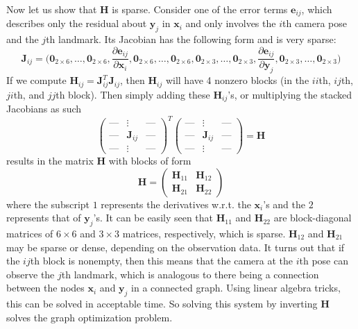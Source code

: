 \documentclass{article}
\theoremstyle{definition}
\theoremstyle{remark}
\theoremstyle{definition}
\begin{document}
Now let us show that $\mathbf{H}$ is sparse. Consider one of the error terms $\mathbf{e}_{ij}$, which describes only the residual about $\mathbf{y}_j$ in $\mathbf{x}_i$ and only involves the $i$th camera pose and the $j$th landmark. Its Jacobian has the following form and is very sparse: 
\[\mathbf{J}_{ij} = \bigg( \mathbf{0}_{2 \times 6}, \ldots, \mathbf{0}_{2 \times 6}, \frac{\partial \mathbf{e}_{ij}}{\partial \mathbf{x}_i}, \mathbf{0}_{2 \times 6}, \ldots, \mathbf{0}_{2 \times 6}, \mathbf{0}_{2 \times 3}, \ldots, \mathbf{0}_{2 \times 3}, \frac{\partial \mathbf{e}_{ij}}{\partial \mathbf{y}_j}, \mathbf{0}_{2 \times 3}, \ldots, \mathbf{0}_{2 \times 3} \bigg)\]
If we compute $\mathbf{H}_{ij} = \mathbf{J}_{ij}^T \mathbf{J}_{ij}$, then $\mathbf{H}_{ij}$ will have 4 nonzero blocks (in the $ii$th, $ij$th, $ji$th, and $jj$th block). Then simply adding these $\mathbf{H}_{ij}$'s, or multiplying the stacked Jacobians as such 
\[\begin{pmatrix} \text{---} & \vdots & \text{---} \\ \text{---} & \mathbf{J}_{ij} & \text{---} \\ \text{---} & \vdots & \text{---} \end{pmatrix}^T \begin{pmatrix} \text{---} & \vdots & \text{---} \\ \text{---} & \mathbf{J}_{ij} & \text{---} \\ \text{---} & \vdots & \text{---} \end{pmatrix} = \mathbf{H}\]
results in the matrix $\mathbf{H}$ with blocks of form 
\[\mathbf{H} = \begin{pmatrix} \mathbf{H}_{11} & \mathbf{H}_{12} \\ \mathbf{H}_{21}  & \mathbf{H}_{22} \end{pmatrix}\]
where the subscript $1$ represents the derivatives w.r.t. the $\mathbf{x}_i$'s and the $2$ represents that of $\mathbf{y}_j$'s. It can be easily seen that $\mathbf{H}_{11}$ and $\mathbf{H}_{22}$ are block-diagonal matrices of $6 \times 6$ and $3 \times 3$ matrices, respectively, which is sparse. $\mathbf{H}_{12}$ and $\mathbf{H}_{21}$ may be sparse or dense, depending on the observation data. It turns out that if the $ij$th block is nonempty, then this means that the camera at the $i$th pose can observe the $j$th landmark, which is analogous to there being a connection between the nodes $\mathbf{x}_i$ and $\mathbf{y}_j$ in a connected graph. Using linear algebra tricks, this can be solved in acceptable time. So solving this system by inverting $\mathbf{H}$ solves the graph optimization problem. 
\end{document}
